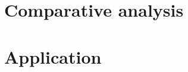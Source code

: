 \documentclass[12pt, a4paper]{article}
\begin{document}
\section{Comparative analysis} \label{sec:analysis}


\section{Application} \label{sec:application}




\end{document}
